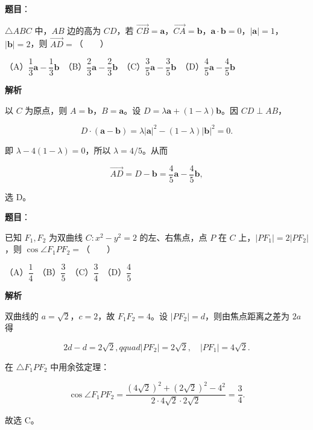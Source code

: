 \begin{answer}

\textbf{题目}：

$\triangle ABC$ 中，$AB$ 边的高为 $CD$，若 $\overrightarrow{CB}=\boldsymbol a$，$\overrightarrow{CA}=\boldsymbol b$，$\boldsymbol a\cdot\boldsymbol b=0$，$|\boldsymbol a|=1$，$|\boldsymbol b|=2$，则 $\overrightarrow{AD}=$\mbox{（　　）}

（A）$\dfrac13\boldsymbol a-\dfrac13\boldsymbol b$　（B）$\dfrac23\boldsymbol a-\dfrac23\boldsymbol b$　（C）$\dfrac35\boldsymbol a-\dfrac35\boldsymbol b$　（D）$\dfrac45\boldsymbol a-\dfrac45\boldsymbol b$

\textbf{解析}

以 $C$ 为原点，则 $A=\boldsymbol b$，$B=\boldsymbol a$。设 $D=\lambda\boldsymbol a+(1-\lambda)\boldsymbol b$。因 $CD\perp AB$，

\nopagebreak[4]
\[
D\cdot(\boldsymbol a-\boldsymbol b)=\lambda|\boldsymbol a|^2-(1-\lambda)|\boldsymbol b|^2=0.
\]

即 $\lambda-4(1-\lambda)=0$，所以 $\lambda=4/5$。从而

\nopagebreak[4]
\[
\overrightarrow{AD}=D-\boldsymbol b=\frac45\boldsymbol a-\frac45\boldsymbol b,
\]

选 D。


\end{answer}
\begin{answer}

\textbf{题目}：

已知 $F_1,F_2$ 为双曲线 $C:x^2-y^2=2$ 的左、右焦点，点 $P$ 在 $C$ 上，$|PF_1|=2|PF_2|$，则 $\cos\angle F_1PF_2=$\mbox{（　　）}

（A）$\dfrac14$　（B）$\dfrac35$　（C）$\dfrac34$　（D）$\dfrac45$

\textbf{解析}

双曲线的 $a=\sqrt2$，$c=2$，故 $F_1F_2=4$。设 $|PF_2|=d$，则由焦点距离之差为 $2a$ 得

\nopagebreak[4]
\[
2d-d=2\sqrt2,qquad |PF_2|=2\sqrt2,\quad |PF_1|=4\sqrt2.
\]

在 $\triangle F_1PF_2$ 中用余弦定理：

\nopagebreak[4]
\[
\cos\angle F_1PF_2=
\frac{(4\sqrt2)^2+(2\sqrt2)^2-4^2}{2\cdot4\sqrt2\cdot2\sqrt2}=\frac34.
\]

故选 C。


\end{answer}
